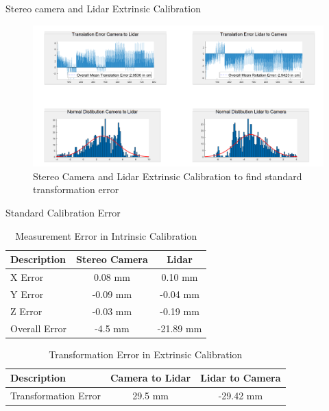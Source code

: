 \documentclass[10pt]{beamer}
\begin{document}
\begin{frame}{Stereo camera and Lidar Extrinsic Calibration}
    \begin{figure}
        \centering
        \includegraphics[width=1\textwidth]{Images/Extrinsic_Calibration.png}
        \caption{Stereo Camera and Lidar Extrinsic Calibration to find standard transformation error}
    \end{figure}
\end{frame}

\begin{frame}{Standard Calibration Error}
\begin{table}
    \centering
    \begin{tabular}{|l|c|c|}
        \hline
        Description & Stereo Camera & Lidar \\
        \hline
        X Error & 0.08 mm & 0.10 mm \\
        \hline
        Y Error & -0.09 mm & -0.04 mm \\ 
        \hline
        Z Error & -0.03 mm  & -0.19 mm \\
        \hline
        Overall Error & -4.5 mm & -21.89 mm \\
        \hline
    \end{tabular}
    \caption{Measurement Error in Intrinsic Calibration}
\end{table}

\begin{table}
    \centering
    \begin{tabular}{|l|c|c|}
        \hline
        Description & Camera to Lidar & Lidar to Camera \\
        \hline
        Transformation Error & 29.5 mm & -29.42 mm \\
        \hline
    \end{tabular}
    \caption{Transformation Error in Extrinsic Calibration}
\end{table}
\end{frame}
\end{document}
